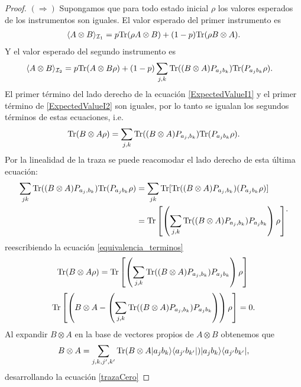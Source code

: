 \documentclass[12pt,oneside]{book}\raggedbottom{}
\begin{document}
\begin{proof}$(\Rightarrow)$ Supongamos que para todo estado inicial $\rho$ los valores esperados de los instrumentos son iguales.  El valor esperado del primer instrumento es \begin{equation}\label{ExpectedValueI1}\begin{split}
	\langle A\otimes B \rangle_{\mathcal{I}_1}& = p{\rm Tr}(\rho A\otimes B)+(1-p){\rm Tr}(\rho B\otimes A).\\
\end{split}\end{equation} Y el valor esperado del segundo instrumento es \begin{equation}\label{ExpectedValueI2}
    \begin{split}
        \langle A\otimes B \rangle_{\mathcal{I}_2}&=p{\rm Tr}(A\otimes B \rho)+(1-p)\sum_{j,k}{\rm Tr}((B\otimes A )P_{a_j b_k} ){\rm Tr}(P_{a_j b_k}\rho).
    \end{split}
\end{equation}El primer término del lado derecho de la ecuación {\ref{ExpectedValueI1}} y el primer término de {\ref{ExpectedValueI2}} son iguales, por lo tanto se igualan los segundos términos de estas ecuaciones, i.e.\begin{equation}\label{equivalencia_terminos}{\rm Tr}(B\otimes A \rho)=\sum_{j,k}{\rm Tr}((B\otimes A) P_{a_j,b_k}){\rm Tr}(P_{a_j b_k}\rho ).\end{equation} Por la linealidad de la traza se puede reacomodar el lado derecho de esta última ecuación: \[\begin{split}\sum_{jk}{\rm Tr}((B\otimes A) P_{a_j,b_k}){\rm Tr}(P_{a_j b_k}\rho )&= \sum_{jk}{\rm Tr}[{\rm Tr}((B\otimes A) P_{a_j,b_k})(P_{a_j b_k}\rho )]\\
	&={\rm Tr}\left[\left(\sum_{j,k}{\rm Tr}((B\otimes A) P_{a_j,b_k})P_{a_j b_k}\right)\rho \right]\end{split}.\]  reescribiendo la ecuación {\ref{equivalencia_terminos}} 
	\[{\rm Tr}(B\otimes A \rho)={\rm Tr}\left[\left(\sum_{j,k}{\rm Tr}((B\otimes A) P_{a_j,b_k})P_{a_j b_k}\right)\rho \right]\\ \]
\begin{equation}\label{trazaCero}\begin{split}
	{\rm Tr}\left[\left(B\otimes A-\left(\sum_{j,k}{\rm Tr}((B\otimes A) P_{a_j,b_k})P_{a_j b_k}\right)\right)\rho \right]=0\\ \end{split}.\end{equation}
	Al expandir $B\otimes A$ en la base de vectores propios de $A\otimes B$ obtenemos que \[B\otimes A=\sum_{j,k,j',k'}{\rm Tr}(B\otimes A |a_j b_k\rangle \langle a_{j'}b_{k'}|)|a_j b_k\rangle \langle a_{j'}b_{k'}|,\] desarrollando la ecuación {\ref{trazaCero}}   

\end{proof}
\end{document}
